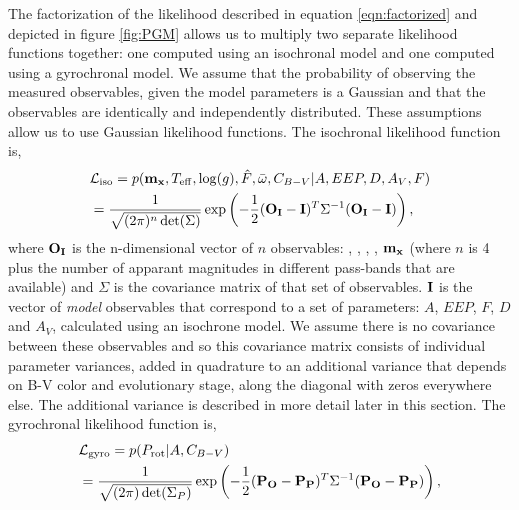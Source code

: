The factorization of the likelihood described in equation \ref{eqn:factorized}
and depicted in figure \ref{fig:PGM} allows us to multiply two separate
likelihood functions together: one computed using an isochronal model and one
computed using a gyrochronal model.
We assume that the probability of observing the measured observables, given
the model parameters is a Gaussian and that the observables are identically
and independently distributed.
These assumptions allow us to use Gaussian likelihood functions.
The isochronal likelihood function is,
\begin{eqnarray} \label{eqn:isochrones_only_likelihood}
    & \mathcal{L_{\mathrm{iso}}} = p({\bf m_x}, T_{\mathrm{eff}}, \log(g),
    \hat{F},
    \bar{\omega}, C_{B-V}|A, EEP, D,
    A_V, F) \\ \nonumber
    & = \frac{1}{\sqrt{(2\pi)^n \det(\Sigma)}}
    \exp\left( -\frac{1}{2} ({\bf O_I} - {\bf I})^T \Sigma ^{-1}
    ({\bf O_I} - {\bf I})\right),
\end{eqnarray}
where ${\bf O_I}$ is the n-dimensional vector of $n$ observables: \teff,
\logg, \fhat, \pmega, ${\bf m_x}$ (where $n$ is 4 plus the number of
apparant magnitudes in different pass-bands that are available) and $\Sigma$
is the covariance matrix of that set of observables.
${\bf I}$ is the vector of {\it model} observables that correspond to a set of
parameters: $A$, $EEP$, $F$, $D$ and $A_V$, calculated using an isochrone model.
We assume there is no covariance between these observables and so this
covariance matrix consists of individual parameter variances, added in
quadrature to an additional variance that depends on B-V color and
evolutionary stage, along the diagonal with zeros everywhere else.
The additional variance is described in more detail later in this section.
The gyrochronal likelihood function is,
\begin{eqnarray} \label{eqn:gyro_likelihood}
    & \mathcal{L_{\mathrm{gyro}}} = p(P_\mathrm{rot} |A, C_{B-V}) \\ \nonumber
    & = \frac{1}{\sqrt{(2\pi) \det(\Sigma_P)}}
    \exp\left( -\frac{1}{2} ({\bf P_O} - {\bf P_P})^T \Sigma ^{-1}
    ({\bf P_O} - {\bf P_P})\right),
\end{eqnarray}
